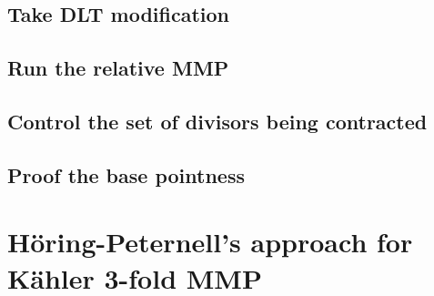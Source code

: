 \documentclass[11pt]{article}
\theoremstyle{definition}
\begin{document}
	\subsection{Take DLT modification}
	
	\subsection{Run the relative MMP}
	
	\subsection{Control the set of divisors being contracted}
	
	\subsection{Proof the base pointness}
	
	
	\section{H\"oring-Peternell's approach for K\"ahler 3-fold MMP}
	
	
	
	
	
	
\end{document}
